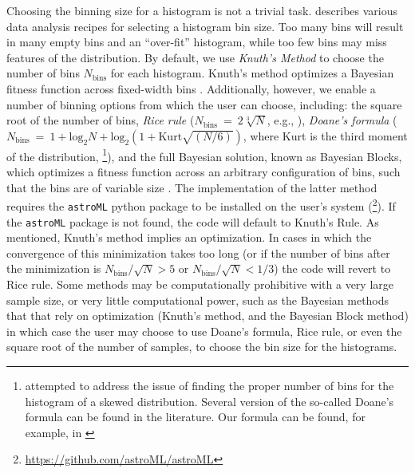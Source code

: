 \documentclass{emulateapj}
\begin{document}
Choosing the binning size for a histogram is not a trivial task.  \citet{hogg08} describes various data analysis recipes for selecting a histogram bin size. Too many bins will result in many empty bins and an ``over-fit'' histogram, while too few bins may miss features of the distribution. 
By default, we use \emph{Knuth's Method} to choose the number of bins $N_\mathrm{bins}$ for each histogram. Knuth's method  optimizes  a Bayesian fitness function across fixed-width bins \citep{knuth06}. Additionally, however, we enable a number of binning options from which the user can choose, including: 
the square root of the number of bins, \emph{Rice rule} ($N_\mathrm{bins}~=~2\sqrt[3]{N}$, e.g., \citealt{hastie09}), 
\emph{Doane's formula} ($N_\mathrm{bins}~=~1 + \mathrm{log}_2{N} + \mathrm{log}_2\left(1 + \mathrm{Kurt}\sqrt{(N / 6)}\right)$, where Kurt is the third moment of the distribution, \citealt{doane76}\footnote{\citet{doane76} attempted to address the issue of finding the proper number of bins for the histogram of a skewed distribution. Several version of the so-called Doane's formula can be found in the literature. Our formula can be found, for example, in \citealt{bonate11}}), and the full Bayesian solution, known as Bayesian Blocks, which optimizes a fitness function across an arbitrary configuration of bins, such that the bins are of variable size \citep{scargle13}. The implementation of the latter method requires the \verb=astroML= python package to be installed on the user's system (\citealt{astroml}\footnote{\url{https://github.com/astroML/astroML}}). If the \verb=astroML= package is not found, the code will default to Knuth's Rule. 
As mentioned, Knuth's method implies an optimization. In cases in which the convergence of this minimization takes too long (or if the number of bins after the minimization is  $N_\mathrm{bins}/\sqrt{N} > 5$ or $N_\mathrm{bins}/\sqrt{N} < 1/3$) the code will revert to Rice rule.
Some methods may be computationally prohibitive with a very large sample size, or very little computational power, such as the Bayesian methods that that rely on optimization (Knuth's method, and the Bayesian Block method) in which case the user may choose to use Doane's formula, Rice rule, or even the square root of the number of samples, to choose the bin size for the histograms. 
\end{document}

